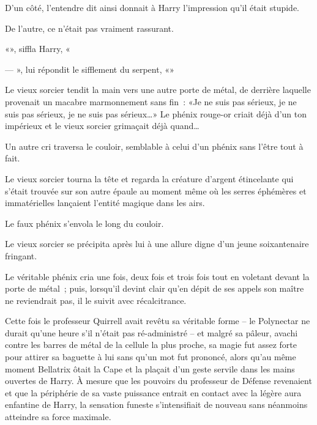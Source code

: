 D'un côté, l'entendre dit ainsi donnait à Harry l'impression qu'il était stupide.

De l'autre, ce n'était pas vraiment rassurant.

«», siffla Harry, «

--- », lui répondit le sifflement du serpent, «»

\later

Le vieux sorcier tendit la main vers une autre porte de métal, de derrière laquelle provenait un macabre marmonnement sans fin~: «Je ne suis pas sérieux, je ne suis pas sérieux, je ne suis pas sérieux…» Le phénix rouge-or criait déjà d'un ton impérieux et le vieux sorcier grimaçait déjà quand…

Un autre cri traversa le couloir, semblable à celui d'un phénix sans l'être tout à fait.

Le vieux sorcier tourna la tête et regarda la créature d'argent étincelante qui s'était trouvée sur son autre épaule au moment même où les serres éphémères et immatérielles lançaient l'entité magique dans les airs.

Le faux phénix s'envola le long du couloir.

Le vieux sorcier se précipita après lui à une allure digne d'un jeune soixantenaire fringant.

Le véritable phénix cria une fois, deux fois et trois fois tout en voletant devant la porte de métal~; puis, lorsqu'il devint clair qu'en dépit de ses appels son maître ne reviendrait pas, il le suivit avec récalcitrance.

\later

Cette fois le professeur Quirrell avait revêtu sa véritable forme -- le Polynectar ne durait qu'une heure s'il n'était pas ré-administré -- et malgré sa pâleur, avachi contre les barres de métal de la cellule la plus proche, sa magie fut assez forte pour attirer sa baguette à lui sans qu'un mot fut prononcé, alors qu'au même moment Bellatrix ôtait la Cape et la plaçait d'un geste servile dans les mains ouvertes de Harry. À mesure que les pouvoirs du professeur de Défense revenaient et que la périphérie de sa vaste puissance entrait en contact avec la légère aura enfantine de Harry, la sensation funeste s'intensifiait de nouveau sans néanmoins atteindre sa force maximale.

